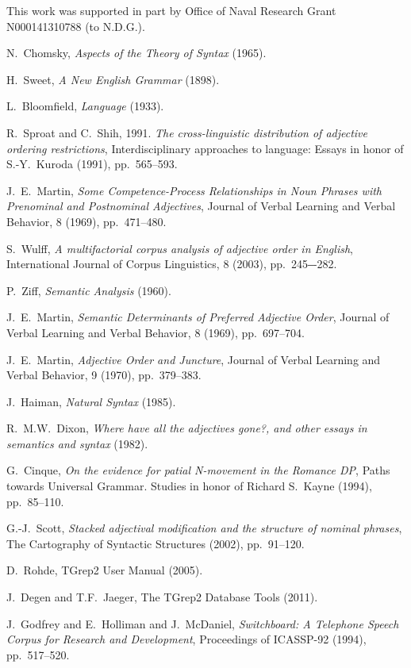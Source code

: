 \documentclass{pnastwo}
\begin{document}
\begin{article}
\begin{materials}
\end{materials}

\begin{acknowledgments}
This work was supported in part by Office of Naval Research Grant N000141310788 (to N.D.G.).
\end{acknowledgments}

\begin{thebibliography}{10}
	N.~Chomsky, {\em Aspects of the Theory of Syntax} (1965).

	H.~Sweet, {\em A New English Grammar} (1898).
	
	L.~Bloomfield, {\em Language} (1933).
	
	R.~Sproat and C.~Shih, 1991. {\em The cross-linguistic distribution of adjective ordering restrictions}, Interdisciplinary approaches to language: Essays in honor of S.-Y.~Kuroda (1991), pp.~565--593.
	
	J.~E.~Martin, {\em Some Competence-Process Relationships in Noun Phrases with Prenominal and Postnominal Adjectives}, Journal of Verbal Learning and Verbal Behavior, 8 (1969), pp.~471--480. 	
	
	S.~Wulff, {\em A multifactorial corpus analysis of adjective order in English},
	International Journal of Corpus Linguistics, 8 (2003), pp.~245‒-282.
	
	P.~Ziff, {\em Semantic Analysis} (1960).
	
	J.~E.~Martin, {\em Semantic Determinants of Preferred Adjective Order}, Journal of Verbal Learning and Verbal Behavior, 8 (1969), pp.~697--704. 
	
	J.~E.~Martin, {\em Adjective Order and Juncture}, Journal of Verbal Learning and Verbal Behavior, 9 (1970), pp.~379--383. 
	
	J.~Haiman, {\em Natural Syntax} (1985).
	
	R.~M.W.~Dixon, {\em Where have all the adjectives gone?, and other essays in semantics and syntax} (1982).
	
	G.~Cinque, {\em On the evidence for patial N-movement in the Romance DP}, Paths towards Universal Grammar. Studies in honor of Richard S.~Kayne (1994), pp.~85--110.
	
	G.-J.~Scott, {\em Stacked adjectival modification and the structure of nominal phrases}, The Cartography of Syntactic Structures (2002), pp.~91--120.
	
	D.~Rohde, TGrep2 User Manual (2005).
	
	J.~Degen and T.F.~Jaeger, The TGrep2 Database Tools (2011).
	
	J.~Godfrey and E.~Holliman and J.~McDaniel, {\em Switchboard: A Telephone Speech Corpus for Research and Development}, Proceedings of ICASSP-92 (1994),
	pp.~517--520.
\end{thebibliography}


\end{article}
\end{document}
